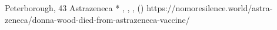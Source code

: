           {Peterborough, }
          {43}
          {Astrazeneca}
          {*}
          {
            ,
            ,
            ,
             ()
          }
          {https://nomoresilence.world/astra-zeneca/donna-wood-died-from-astrazeneca-vaccine/}


